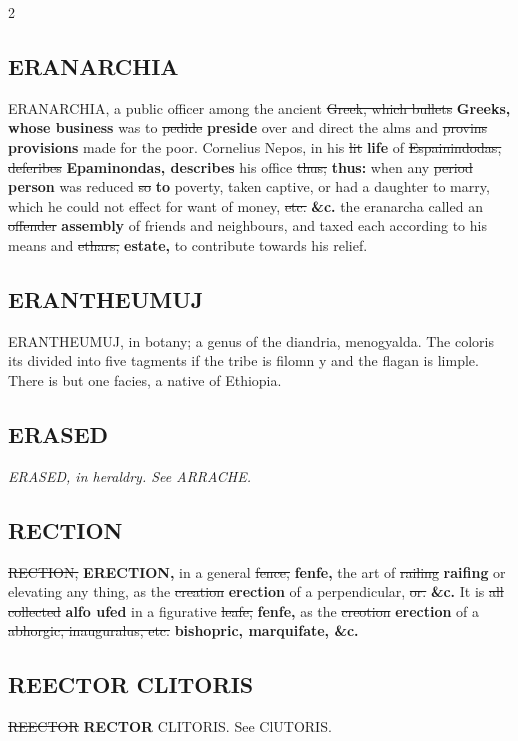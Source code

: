 \documentclass[10pt]{article}
\begin{document}
\begin{multicols}{2}
\subsection*{ERANARCHIA}
ERANARCHIA, a public officer among the ancient \sout{Greek, which bullets} \textbf{Greeks, whose business} was to \sout{pedide} \textbf{preside} over and direct the alms and \sout{provins} \textbf{provisions} made for the poor. Cornelius Nepos, in his \sout{lit} \textbf{life} of \sout{Espainindodas, deferibes} \textbf{Epaminondas, describes} his office \sout{thus;} \textbf{thus:} when any \sout{period} \textbf{person} was reduced \sout{so} \textbf{to} poverty, taken captive, or had a daughter to marry, which he could not effect for want of money, \sout{etc.} \textbf{\&c.} the eranarcha called an \sout{offender} \textbf{assembly} of friends and neighbours, and taxed each according to his means and \sout{ethars,} \textbf{estate,} to contribute towards his relief.

\subsection*{ERANTHEUMUJ}
ERANTHEUMUJ, in botany; a genus of the diandria, menogyalda. The coloris its divided into five tagments if the tribe is filomn y and the flagan is limple. There is but one facies, a native of Ethiopia.

\subsection*{ERASED}
\textit{ERASED, in heraldry. See ARRACHE.}

\subsection*{RECTION}
\sout{RECTION,} \textbf{ERECTION,} in a general \sout{fence,} \textbf{fenfe,} the art of \sout{railing} \textbf{raifing} or elevating any thing, as the \sout{creation} \textbf{erection} of a perpendicular, \sout{or.} \textbf{\&c.} It is \sout{all collected} \textbf{alfo ufed} in a figurative \sout{leafe,} \textbf{fenfe,} as the \sout{creotion} \textbf{erection} of a \sout{abhorgic, inauguralus, etc.} \textbf{bishopric, marquifate, \&c.}

\subsection*{REECTOR CLITORIS}
\sout{REECTOR} \textbf{RECTOR} CLITORIS. See ClUTORIS.


\end{multicols}
\end{document}
